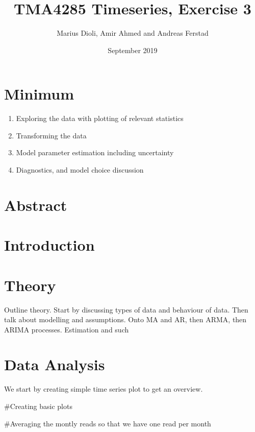 \documentclass[]{article}
\title{TMA4285 Timeseries, Exercise 3}
\author{Marius Dioli, Amir Ahmed and Andreas Ferstad}
\date{September 2019}
\providecommand{\tightlist}{%
  \setlength{\itemsep}{0pt}\setlength{\parskip}{0pt}}
\begin{document}
\maketitle

\hypertarget{minimum}{%
\section{Minimum}\label{minimum}}

\begin{enumerate}
\def\labelenumi{\arabic{enumi}.}
\tightlist
\item
  Exploring the data with plotting of relevant statistics
\item
  Transforming the data
\item
  Model parameter estimation including uncertainty
\item
  Diagnostics, and model choice discussion
\end{enumerate}

\hypertarget{abstract}{%
\section{Abstract}\label{abstract}}

\hypertarget{introduction}{%
\section{Introduction}\label{introduction}}

\hypertarget{theory}{%
\section{Theory}\label{theory}}

Outline theory. Start by discussing types of data and behaviour of data.
Then talk about modelling and assumptions. Onto MA and AR, then ARMA,
then ARIMA processes. Estimation and such

\hypertarget{data-analysis}{%
\section{Data Analysis}\label{data-analysis}}

We start by creating simple time series plot to get an overview.

\#Creating basic plots

\#Averaging the montly reads so that we have one read per month
\end{document}
